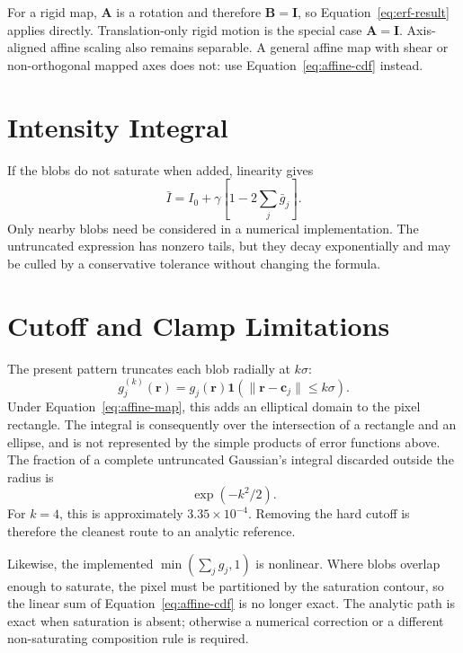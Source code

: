 \documentclass[11pt,a4paper]{article}
\begin{document}
For a rigid map, $\mathbf{A}$ is a rotation and therefore
$\mathbf{B}=\mathbf{I}$, so Equation~\eqref{eq:erf-result} applies
directly.  Translation-only rigid motion is the special case
$\mathbf{A}=\mathbf{I}$.  Axis-aligned affine scaling also remains
separable.  A general affine map with shear or non-orthogonal mapped axes
does not: use Equation~\eqref{eq:affine-cdf} instead.

\section{Intensity Integral}

If the blobs do not saturate when added, linearity gives
\begin{equation}
 \bar{I}=I_0+\gamma\left[1-2\sum_j\bar{g}_j\right].
\end{equation}
Only nearby blobs need be considered in a numerical implementation.  The
untruncated expression has nonzero tails, but they decay exponentially and
may be culled by a conservative tolerance without changing the formula.

\section{Cutoff and Clamp Limitations}
\label{sec:limits}

The present pattern truncates each blob radially at $k\sigma$:
\begin{equation}
 g_j^{(k)}(\mathbf{r})=g_j(\mathbf{r})
 \mathbf{1}\!\left(\lVert\mathbf{r}-\mathbf{c}_j\rVert\leq k\sigma\right).
\end{equation}
Under Equation~\eqref{eq:affine-map}, this adds an elliptical domain to the
pixel rectangle.  The integral is consequently over the intersection of a
rectangle and an ellipse, and is not represented by the simple products of
error functions above.  The fraction of a complete untruncated Gaussian's
integral discarded outside the radius is
\begin{equation}
 \exp\left(-k^2/2\right).
\end{equation}
For $k=4$, this is approximately $3.35\times10^{-4}$.  Removing the hard
cutoff is therefore the cleanest route to an analytic reference.

Likewise, the implemented $\min(\sum_j g_j,1)$ is nonlinear.  Where blobs
overlap enough to saturate, the pixel must be partitioned by the saturation
contour, so the linear sum of Equation~\eqref{eq:affine-cdf} is no longer
exact.  The analytic path is exact when saturation is absent; otherwise a
numerical correction or a different non-saturating composition rule is
required.
\end{document}
